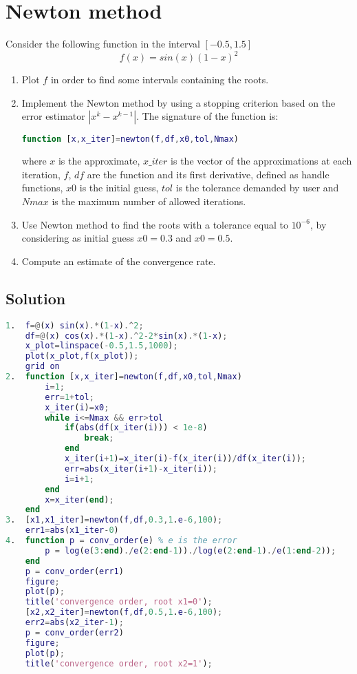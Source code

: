 \documentclass[12pt, a4paper]{report}
\newtheorem[style=M,bodystyle=\normalfont]{theorem}{Theorem}
\newtheorem[style=M,bodystyle=\normalfont]{corollary}{Corollary}
\newtheorem[style=M,bodystyle=\normalfont]{lemma}{Lemma}
\newtheorem[style=M,bodystyle=\normalfont]{definition}{Definition}
\begin{document}
    \newpage

    \section{Newton method}
        Consider the following function in the interval $[-0.5, 1.5]$
        \[f (x) = sin(x)(1 - x)^2\]
        \begin{enumerate}
            \item Plot $f$ in order to find some intervals containing the roots. 
            \item Implement the Newton method by using a stopping criterion based on the error estimator $\left\lvert x^k - x^{k-1}\right\rvert$. The signature of the function is:
                \begin{lstlisting}[language=Matlab]
function [x,x_iter]=newton(f,df,x0,tol,Nmax)
                \end{lstlisting}  
                where $x$ is the approximate, $x\_iter$ is the vector of the approximations at each iteration, $f$, $df$ are the function and its first derivative, defined as
                handle functions, $x0$ is the initial guess, $tol$ is the tolerance demanded by user and $Nmax$ is the maximum number of allowed iterations.
            \item Use Newton method to find the roots with a tolerance equal to $10^{-6}$, by considering as initial guess $x0 = 0.3$ and $x0 = 0.5$.
            \item Compute an estimate of the convergence rate. 
        \end{enumerate}
    \subsection*{Solution}
        \begin{lstlisting}[language=Matlab]
1.  f=@(x) sin(x).*(1-x).^2;
    df=@(x) cos(x).*(1-x).^2-2*sin(x).*(1-x);
    x_plot=linspace(-0.5,1.5,1000);
    plot(x_plot,f(x_plot));
    grid on
2.  function [x,x_iter]=newton(f,df,x0,tol,Nmax)
        i=1;
        err=1+tol;
        x_iter(i)=x0;
        while i<=Nmax && err>tol
            if(abs(df(x_iter(i))) < 1e-8) 
                break;
            end
            x_iter(i+1)=x_iter(i)-f(x_iter(i))/df(x_iter(i));
            err=abs(x_iter(i+1)-x_iter(i));
            i=i+1;
        end
        x=x_iter(end);
    end
3.  [x1,x1_iter]=newton(f,df,0.3,1.e-6,100);
    err1=abs(x1_iter-0)
4.  function p = conv_order(e) % e is the error
        p = log(e(3:end)./e(2:end-1))./log(e(2:end-1)./e(1:end-2));
    end
    p = conv_order(err1)
    figure;
    plot(p);
    title('convergence order, root x1=0');
    [x2,x2_iter]=newton(f,df,0.5,1.e-6,100);
    err2=abs(x2_iter-1);
    p = conv_order(err2)
    figure;
    plot(p);
    title('convergence order, root x2=1');
        \end{lstlisting}  
\end{document}
